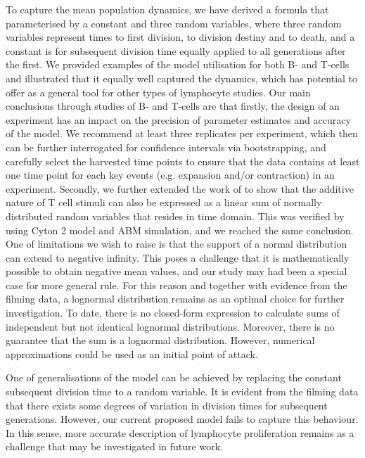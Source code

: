 \documentclass[11pt, a4paper]{article}
\begin{document}
To capture the mean population dynamics, we have derived a formula that parameterised by a constant and three random variables, where three random variables represent times to first division, to division destiny and to death, and a constant is for subsequent division time equally applied to all generations after the first. We provided examples of the model utilisation for both B- and T-cells and illustrated that it equally well captured the dynamics, which has potential to offer as a general tool for other types of lymphocyte studies. Our main conclusions through studies of B- and T-cells are that firstly, the design of an experiment has an impact on the precision of parameter estimates and accuracy of the model. We recommend at least three replicates per experiment, which then can be further interrogated for confidence intervals via bootstrapping, and carefully select the harvested time points to ensure that the data contains at least one time point for each key events (e.g. expansion and/or contraction) in an experiment. Secondly, we further extended the work of \cite{Marchingo.2014} to show that the additive nature of T cell stimuli can also be expressed as a linear sum of normally distributed random variables that resides in time domain. This was verified by using Cyton 2 model and ABM simulation, and we reached the same conclusion. One of limitations we wish to raise is that the support of a normal distribution can extend to negative infinity. This poses a challenge that it is mathematically possible to obtain negative mean values, and our study may had been a special case for more general rule. For this reason and together with evidence from the filming data, a lognormal distribution remains as an optimal choice for further investigation. To date, there is no closed-form expression to calculate sums of independent but not identical lognormal distributions. Moreover, there is no guarantee that the sum is a lognormal distribution. However, numerical approximations \parencite{Mehta.2007, Lo.2012} could be used as an initial point of attack.

One of generalisations of the model can be achieved by replacing the constant subsequent division time to a random variable. It is evident from the filming data that there exists some degrees of variation in division times for subsequent generations. However, our current proposed model fails to capture this behaviour. In this sense, more accurate description of lymphocyte proliferation remains as a challenge that may be investigated in future work.
\end{document}
